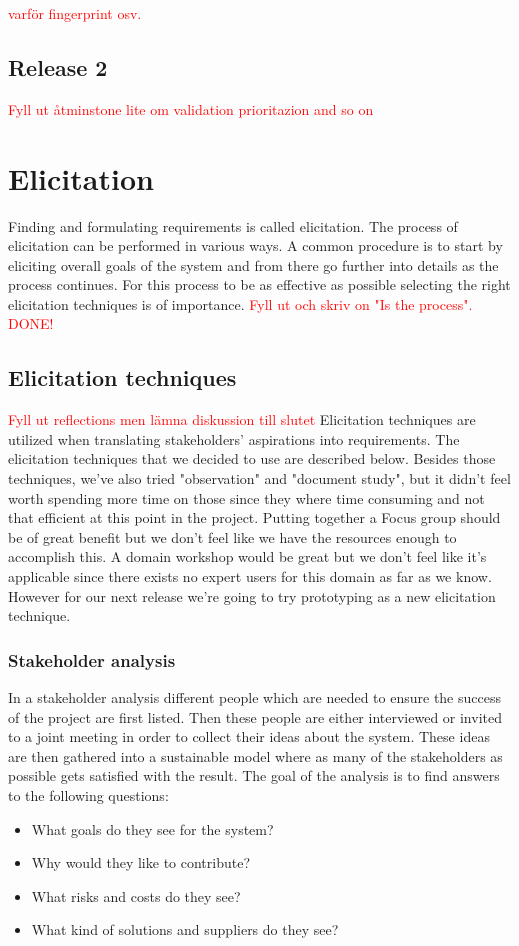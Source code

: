 \documentclass[10pt]{article}
\newcommand\todo[1]{\textcolor{red}{#1}}
\begin{document}
\todo{varför fingerprint osv.}

\subsection{Release 2}
\todo{Fyll ut åtminstone lite om validation prioritazion and so on}

\section{Elicitation}
\sloppy
\noindent Finding and formulating requirements is called elicitation. The process of elicitation can be performed in various ways. A common procedure is to start by eliciting overall goals of the system and from there go further into details as the process continues. For this process to be as effective as possible selecting the right elicitation techniques is of importance. 
\todo{Fyll ut och skriv on "Is the process". DONE!}

\subsection{Elicitation techniques}
\todo{Fyll ut reflections men lämna diskussion till slutet}
Elicitation techniques are utilized when translating stakeholders' aspirations into requirements.
The elicitation techniques that we decided to use are described below.
Besides those techniques, we've also tried "observation" and "document study", but it didn't feel worth spending more time on those since they where time consuming and not that efficient at this point in the project.
Putting together a Focus group should be of great benefit but we don’t feel like we have the resources enough to accomplish this.
A domain workshop would be great but we don't feel like it's applicable since there exists no expert users for this domain as far as we know.
However for our next release we're going to try prototyping as a new elicitation technique.

\subsubsection{Stakeholder analysis}
In a stakeholder analysis different people which are needed to ensure the success of the project are first listed. Then these people are either interviewed or invited to a joint meeting in order to collect their ideas about the system. These ideas are then gathered into a sustainable model where as many of the stakeholders as possible gets satisfied with the result. The goal of the analysis is to find answers to the following questions:
\begin{itemize}
\item What goals do they see for the system?
\item Why would they like to contribute?
\item What risks and costs do they see?
\item What kind of solutions and suppliers do they see?
\end{itemize}
\end{document}
